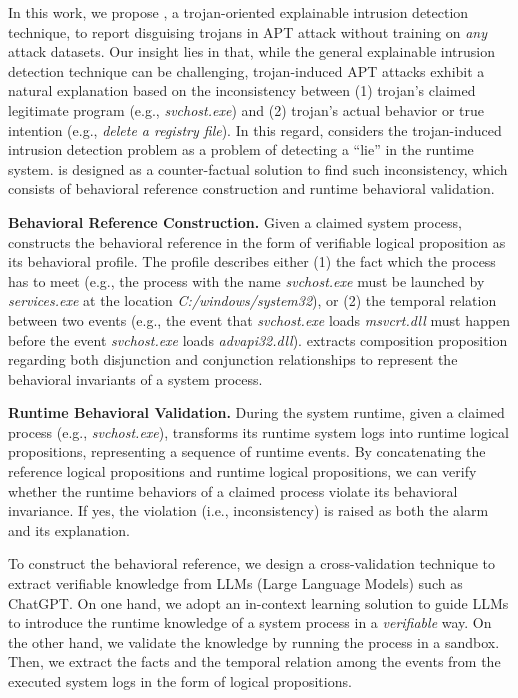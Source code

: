 In this work, we propose \tool,
a trojan-oriented explainable intrusion detection technique,
to report disguising trojans in APT attack without training on \textit{any} attack datasets.
Our insight lies in that,
while the general explainable intrusion detection technique can be challenging,
trojan-induced APT attacks exhibit a natural explanation based on
the inconsistency between 
(1) trojan's claimed legitimate program (e.g., \textit{svchost.exe}) and
(2) trojan's actual behavior or true intention (e.g., \textit{delete a registry file}).
In this regard, 
\tool considers the trojan-induced intrusion detection problem as a problem of
detecting a ``lie'' in the runtime system.
\tool is designed as a counter-factual solution to find such inconsistency,
which consists of 
behavioral reference construction and
runtime behavioral validation.

\noindent\textbf{Behavioral Reference Construction.}
Given a claimed system process, \tool constructs the behavioral reference in the form of 
verifiable logical proposition as its behavioral profile.
The profile describes either
(1) the fact which the process has to meet (e.g., the process with the name \textit{svchost.exe} must be launched by \textit{services.exe} at the location \textit{C:/windows/system32}), or
(2) the temporal relation between two events 
(e.g., the event that \textit{svchost.exe} loads \textit{msvcrt.dll} must happen before the event \textit{svchost.exe} loads \textit{advapi32.dll}).
\tool extracts composition proposition regarding both disjunction and conjunction relationships
to represent the behavioral invariants of a system process.

\noindent\textbf{Runtime Behavioral Validation.}
During the system runtime,
given a claimed process (e.g., \textit{svchost.exe}),
\tool transforms its runtime system logs into runtime logical propositions, 
representing a sequence of runtime events.
By concatenating the reference logical propositions and runtime logical propositions,
we can verify whether the runtime behaviors of a claimed process violate its behavioral invariance.
If yes, the violation (i.e., inconsistency) is raised as both the alarm and its explanation.


To construct the behavioral reference, 
we design a cross-validation technique to extract verifiable knowledge from LLMs (Large Language Models) such as ChatGPT.
On one hand, 
we adopt an in-context learning solution to guide LLMs to 
introduce the runtime knowledge of a system process in a \textit{verifiable} way.
On the other hand,
we validate the knowledge by running the process in a sandbox.
Then, we extract the facts and the temporal relation among the events from the executed system logs
in the form of logical propositions.


